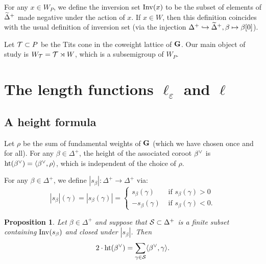 \documentclass[10pt]{amsart}
\newtheorem{prop}[theo]{Proposition}
\newcommand{\textif}{\text{ if }}\newcommand{\textand}{\text{ and }}\newcommand{\textor}{\text{ or }}\newcommand{\suchthat}{\mid}
\begin{document}
For any $x\in W_P$, we define the inversion set $\operatorname{Inv}(x)$ to be the subset of elements of $\widetilde{\Delta}^+$ made negative under the action of $x$. If $x \in W$, then this definition coincides with the usual definition of inversion set (via the injection $\Delta^+\hookrightarrow\widetilde{\Delta}^+,\beta\mapsto\beta[0]$).

Let $\mathcal{T}\subset P$ be the Tits cone in the coweight lattice of $\mathbf{G}$. Our main object of study is $W_{\mathcal{T}}=\mathcal{T}\rtimes W$, which is a subsemigroup of $W_P$.


\section{The length functions \texorpdfstring{$\ell_\varepsilon$}{ell varepsilon} and \texorpdfstring{$\ell$}{ell}}

\subsection{A height formula}

Let $\rho$ be the sum of fundamental weights of $\mathbf{G}$ (which we have chosen once and for all). For any $\beta\in\Delta^+$, the height of the associated coroot $\beta^\vee$ is $\operatorname{ht}(\beta^\vee) = \langle \beta^\vee,\rho \rangle$, which is independent of the choice of $\rho$.

For any $\beta\in\Delta^+$, we define $|s_\beta| : \Delta^+ \rightarrow \Delta^+$ via:
\begin{equation}\label{eq:040}
|s_\beta| (\gamma) = | s_\beta(\gamma) | =
\begin{cases}
s_\beta(\gamma) & \textif s_\beta(\gamma) > 0 \\
-s_\beta(\gamma) & \textif s_\beta(\gamma) < 0.
\end{cases}
\end{equation}

\begin{prop}\label{prop-the-height-formula}
Let $\beta\in\Delta^+$ and suppose that $\mathcal{S} \subset \Delta^+$ is a finite subset containing $\operatorname{Inv}(s_\beta)$ and closed under $|s_\beta|$. Then
\begin{equation}
2 \cdot \operatorname{ht}(\beta^\vee) = \sum_{\gamma \in \mathcal{S}} \langle \beta^\vee, \gamma \rangle.
\end{equation}
\end{prop}
\end{document}
